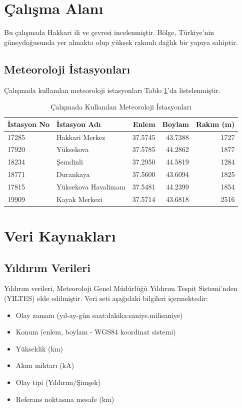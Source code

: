 \section{Çalışma Alanı}

Bu çalışmada Hakkari ili ve çevresi incelenmiştir. Bölge, Türkiye'nin güneydoğusunda yer almakta olup yüksek rakımlı dağlık bir yapıya sahiptir.

\subsection{Meteoroloji İstasyonları}

Çalışmada kullanılan meteoroloji istasyonları Tablo \ref{tab:istasyonlar}'da listelenmiştir.

\begin{table}[H]
\centering
\caption{Çalışmada Kullanılan Meteoroloji İstasyonları}
\label{tab:istasyonlar}
\begin{tabular}{llrrr}
\toprule
İstasyon No & İstasyon Adı & Enlem & Boylam & Rakım (m) \\
\midrule
17285 & Hakkari Merkez & 37.5745 & 43.7388 & 1727 \\
17920 & Yüksekova & 37.5785 & 44.2862 & 1877 \\
18234 & Şemdinli & 37.2950 & 44.5819 & 1284 \\
18771 & Durankaya & 37.5600 & 43.6094 & 1825 \\
17815 & Yüksekova Havalimanı & 37.5481 & 44.2399 & 1854 \\
19909 & Kayak Merkezi & 37.5714 & 43.6818 & 2516 \\
\bottomrule
\end{tabular}
\end{table}

\section{Veri Kaynakları}

\subsection{Yıldırım Verileri}

Yıldırım verileri, Meteoroloji Genel Müdürlüğü Yıldırım Tespit Sistemi'nden (YILTES) elde edilmiştir. Veri seti aşağıdaki bilgileri içermektedir:

\begin{itemize}
    \item Olay zamanı (yıl-ay-gün saat:dakika:saniye.milisaniye)
    \item Konum (enlem, boylam - WGS84 koordinat sistemi)
    \item Yükseklik (km)
    \item Akım miktarı (kA)
    \item Olay tipi (Yıldırım/Şimşek)
    \item Referans noktasına mesafe (km)
\end{itemize}

